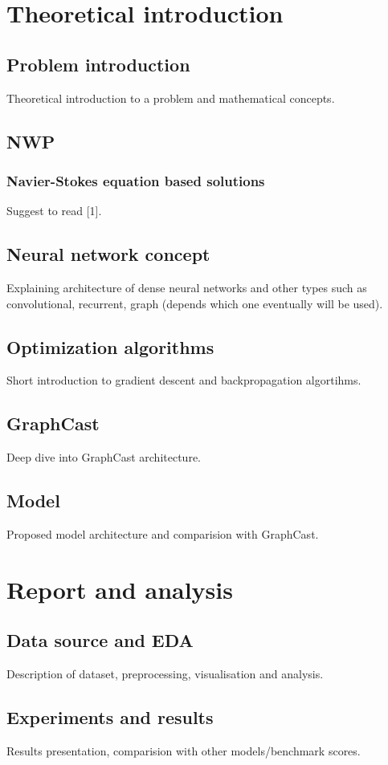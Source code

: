 \documentclass{article}
\begin{document}
	\section{Theoretical introduction}
	
    \subsection{Problem introduction}
	Theoretical introduction to a problem and mathematical concepts. 
    \subsection{NWP}
    \subsubsection{Navier-Stokes equation based solutions}
    Suggest to read [1].
	\subsection{Neural network concept}
	Explaining architecture of dense neural networks and other types such as convolutional, recurrent, graph (depends which one eventually will be used). 
	\subsection{Optimization algorithms}
	Short introduction to gradient descent and backpropagation algortihms. 
	\subsection{GraphCast}
	Deep dive into GraphCast architecture.
	\subsection{Model}
	Proposed model architecture and comparision with GraphCast. 
	
    \section{Report and analysis}
	\subsection{Data source and EDA}
	Description of dataset, preprocessing, visualisation and analysis.
	\subsection{Experiments and results}
	Results presentation, comparision with other models/benchmark scores. 
\end{document}

